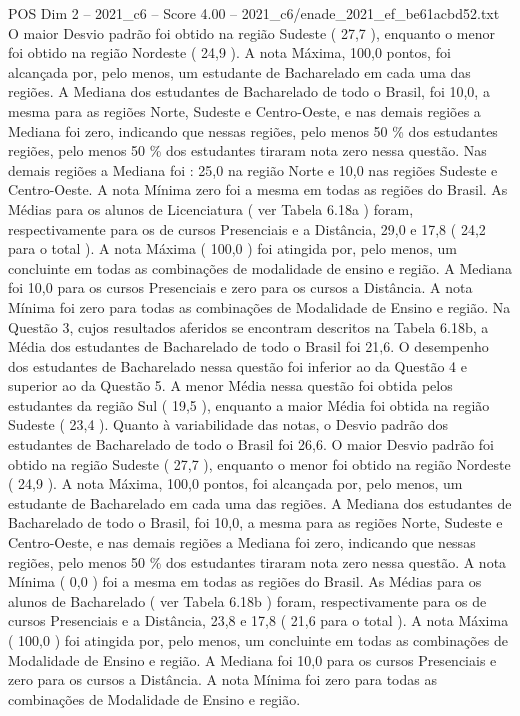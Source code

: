 \begin{textsample}{POS Dim 2 – 2021\_c6 – Score 4.00 – 2021\_c6/enade\_2021\_ef\_be61acbd52.txt}
O maior Desvio padrão foi obtido na região Sudeste ( 27,7 ), enquanto o menor foi obtido na região Nordeste ( 24,9 ).
A nota Máxima, 100,0 pontos, foi alcançada por, pelo menos, um estudante de Bacharelado em cada uma das regiões.
A Mediana dos estudantes de Bacharelado de todo o Brasil, foi 10,0, a mesma para as regiões Norte, Sudeste e Centro-Oeste, e nas demais regiões a Mediana foi zero, indicando que nessas regiões, pelo menos 50 \% dos estudantes regiões, pelo menos 50 \% dos estudantes tiraram nota zero nessa questão.
Nas demais regiões a Mediana foi : 25,0 na região Norte e 10,0 nas regiões Sudeste e Centro-Oeste.
A nota Mínima zero foi a mesma em todas as regiões do Brasil.
As Médias para os alunos de Licenciatura ( ver Tabela 6.18a ) foram, respectivamente para os de cursos Presenciais e a Distância, 29,0 e 17,8 ( 24,2 para o total ).
A nota Máxima ( 100,0 ) foi atingida por, pelo menos, um concluinte em todas as combinações de modalidade de ensino e região.
A Mediana foi 10,0 para os cursos Presenciais e zero para os cursos a Distância.
A nota Mínima foi zero para todas as combinações de Modalidade de Ensino e região.
Na Questão 3, cujos resultados aferidos se encontram descritos na Tabela 6.18b, a Média dos estudantes de Bacharelado de todo o Brasil foi 21,6.
O desempenho dos estudantes de Bacharelado nessa questão foi inferior ao da Questão 4 e superior ao da Questão 5.
A menor Média nessa questão foi obtida pelos estudantes da região Sul ( 19,5 ), enquanto a maior Média foi obtida na região Sudeste ( 23,4 ).
Quanto à variabilidade das notas, o Desvio padrão dos estudantes de Bacharelado de todo o Brasil foi 26,6.
O maior Desvio padrão foi obtido na região Sudeste ( 27,7 ), enquanto o menor foi obtido na região Nordeste ( 24,9 ).
A nota Máxima, 100,0 pontos, foi alcançada por, pelo menos, um estudante de Bacharelado em cada uma das regiões.
A Mediana dos estudantes de Bacharelado de todo o Brasil, foi 10,0, a mesma para as regiões Norte, Sudeste e Centro-Oeste, e nas demais regiões a Mediana foi zero, indicando que nessas regiões, pelo menos 50 \% dos estudantes tiraram nota zero nessa questão.
A nota Mínima ( 0,0 ) foi a mesma em todas as regiões do Brasil.
As Médias para os alunos de Bacharelado ( ver Tabela 6.18b ) foram, respectivamente para os de cursos Presenciais e a Distância, 23,8 e 17,8 ( 21,6 para o total ).
A nota Máxima ( 100,0 ) foi atingida por, pelo menos, um concluinte em todas as combinações de Modalidade de Ensino e região.
A Mediana foi 10,0 para os cursos Presenciais e zero para os cursos a Distância.
A nota Mínima foi zero para todas as combinações de Modalidade de Ensino e região.

\end{textsample}
